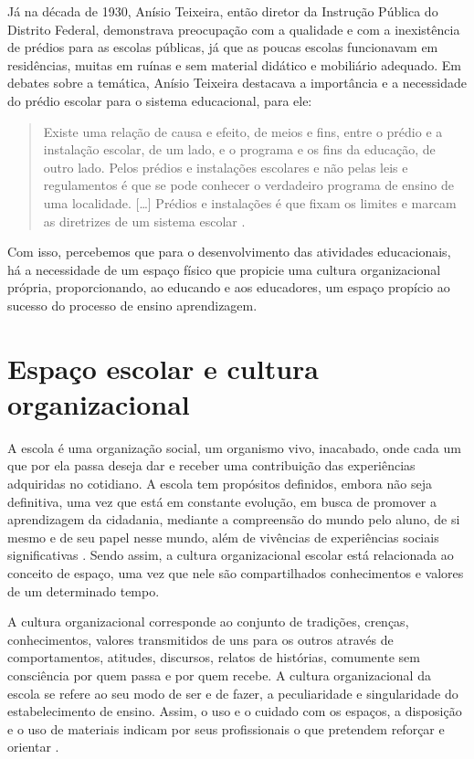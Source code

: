 \begin{refsection}
    Já na década de 1930, Anísio Teixeira, então diretor da Instrução Pública do Distrito Federal, demonstrava preocupação com a qualidade e com a inexistência de prédios para as escolas públicas, já que as poucas escolas funcionavam em residências, muitas em ruínas e sem material didático e mobiliário adequado. Em debates sobre a temática, Anísio Teixeira destacava a importância e a necessidade do prédio escolar para o sistema educacional, para ele:

    \begin{quotation}
        Existe uma relação de causa e efeito, de meios e fins, entre o prédio e a instalação escolar, de um lado, e o programa e os fins da educação, de outro lado. Pelos prédios e instalações escolares e não pelas leis e regulamentos é que se pode conhecer o verdadeiro programa de ensino de uma localidade. [\dots] Prédios e instalações é que fixam os limites e marcam as diretrizes de um sistema escolar \cite[p.~5--6]{TEIXEIRA1934Problema}.
    \end{quotation}

    Com isso, percebemos que para o desenvolvimento das atividades educacionais, há a necessidade de um espaço físico que propicie uma cultura organizacional própria, proporcionando, ao educando e aos educadores, um espaço propício ao sucesso do processo de ensino aprendizagem. 


    \section{Espaço escolar e cultura organizacional}

    A escola é uma organização social, um organismo vivo, inacabado, onde cada um que por ela passa deseja dar e receber uma contribuição das experiências adquiridas no cotidiano. A escola tem propósitos definidos, embora não seja definitiva, uma vez que está em constante evolução, em busca de promover a aprendizagem da cidadania, mediante a compreensão do mundo pelo aluno, de si mesmo e de seu papel nesse mundo, além de vivências de experiências sociais significativas \cite{LÜCK2011Gestão}. Sendo assim, a cultura organizacional escolar está relacionada ao conceito de espaço, uma vez que nele são compartilhados conhecimentos e valores de um determinado tempo. 

    A cultura organizacional corresponde ao conjunto de tradições, crenças, conhecimentos, valores transmitidos de uns para os outros através de comportamentos, atitudes, discursos, relatos de histórias, comumente sem consciência por quem passa e por quem recebe. A cultura organizacional da escola se refere ao seu modo de ser e de fazer, a peculiaridade e singularidade do estabelecimento de ensino. Assim, o uso e o cuidado com os espaços, a disposição e o uso de materiais indicam por seus profissionais o que pretendem reforçar e orientar \cite{LÜCK2011Gestão}. 


\end{refsection}
